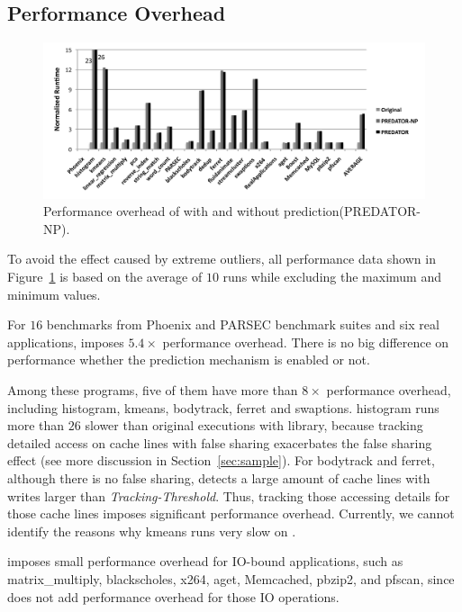 \subsection{Performance Overhead}
\label{sec:perfoverhead}

\begin{figure}[ht]
\begin{center}
\includegraphics[width=6.5in]{fig/perf}
\end{center}
\caption{
Performance overhead of \Predator{} with and without prediction(PREDATOR-NP).
\label{fig:perf}}
\end{figure}

To avoid the effect caused by extreme outliers, all performance data shown in Figure~\ref{fig:perf} is based on the average of $10$ runs while excluding the maximum and minimum values. 

For $16$ benchmarks from Phoenix and PARSEC benchmark suites and six real applications, \Predator{} imposes $5.4\times$ performance overhead. There is no big difference on performance whether the prediction mechanism is enabled or not. 
 
Among these programs, five of them have more than $8\times$ performance overhead, including histogram, kmeans, bodytrack, ferret and swaptions. histogram runs more than $26$ slower than original executions with \pthreads{} library, because tracking detailed access on cache lines with false sharing exacerbates the false sharing effect (see more discussion in Section~\ref{sec:sample}).  For bodytrack and ferret, although there is no false sharing, \Predator{} detects a large amount of cache lines with writes larger than {\it Tracking-Threshold}. Thus, tracking those accessing details for those cache lines imposes significant performance overhead. Currently, we cannot identify the reasons why kmeans runs very slow on \Predator{}.
   
\Predator{} imposes small performance overhead for IO-bound applications, such as matrix\_multiply, blackscholes, x264, aget, Memcached, pbzip2, and pfscan, since \Predator{} does not add performance overhead for those IO operations.  

